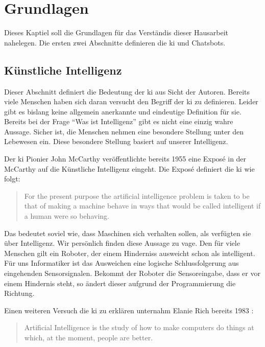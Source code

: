 \section{Grundlagen}
Dieses Kaptiel soll die Grundlagen für das Verständis dieser Hausarbeit nahelegen. Die ersten zwei Abschnitte definieren die \ac{ki} und Chatsbots. 

\subsection{Künstliche Intelligenz}
Dieser Abschnitt definiert die Bedeutung der \ac{ki} aus Sicht der Autoren. Bereits viele Menschen haben sich daran versucht den Begriff der \ac{ki} zu definieren. Leider gibt es bislang keine allgemein anerkannte und eindeutige Definition für sie. Bereits bei der Frage \enquote{Was ist Intelligenz} gibt es nicht eine einzig wahre Aussage. Sicher ist, die Menschen nehmen eine besondere Stellung unter den Lebewesen ein. Diese besondere Stellung basiert auf unserer Intelligenz. 

Der \ac{ki} Pionier John McCarthy \cite{PROPOSALMcCarthy} veröffentlichte bereits 1955 eine Exposé in der McCarthy auf die Künstliche Intelligenz eingeht. Die Exposé definiert die \ac{ki} wie folgt:
\begin{quote}
		For the present purpose the artificial intelligence problem is taken to be that of making a machine behave in ways that would be called intelligent if a human were so behaving.
\end{quote}
Das bedeutet soviel wie, dass Maschinen sich verhalten sollen, als verfügten sie über Intelligenz. Wir persönlich finden diese Aussage zu vage. Den für viele Menschen gilt ein Roboter, der einem Hinderniss ausweicht schon als intelligent. Für uns Informatiker ist das Ausweichen eine logische Schlussfolgerung aus eingehenden Sensorsignalen. Bekommt der Roboter die Sensoreingabe, dass er vor einem Hindernis steht, so ändert dieser aufgrund der Programmierung die Richtung.

Einen weiteren Versuch die \ac{ki} zu erklären unternahm Elanie Rich bereits 1983 \cite{ArtificialIntelligence}: 
\begin{quote}
		Artificial Intelligence is the study of how to make computers do things at which, at the moment, people are better.
\end{quote}

